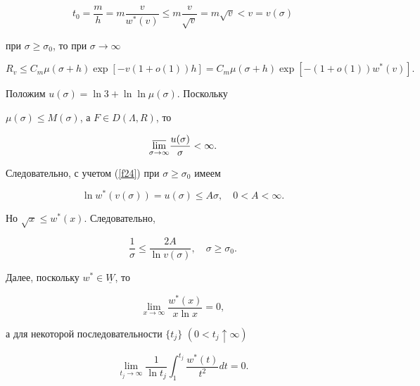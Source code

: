 $$


t_{0}=\frac{m}{h}=m\frac{v}{w^{*}(v)}\leq


m\frac{v}{\sqrt{v}}=m\sqrt{v}<v=v(\sigma)


$$


при $\sigma\geq\sigma_{0}$, то при $\sigma\to\infty$


\begin{equation}\label{f25}


R_{v}\leq C_{m}\mu(\sigma+h)\exp[-v(1+o(1))h]=


C_{m}\mu(\sigma+h)\exp[-(1+o(1))w^{*}(v)].


\end{equation}





Положим $u(\sigma)=\ln 3+\ln \ln \mu(\sigma)$. Поскольку


$\mu(\sigma)\leq M(\sigma)$, а $F\in D(\Lambda,R)$, то


$$


\underset{\sigma\to\infty}{\varlimsup}{}\frac{u(\sigma)}{\sigma}<\infty.


$$


Следовательно, с учетом (\ref{f24}) при $\sigma\geq\sigma_{0}$ имеем


$$


\ln w^{*}(v(\sigma))=u(\sigma)\leq A \sigma,\quad 0<A<\infty.


$$


Но $\sqrt{x}\leq w^{*}(x)$. Следовательно,


\begin{equation}\label{f26}


\frac{1}{\sigma}\leq\frac{2A}{\ln v(\sigma)},\quad \sigma\geq\sigma_{0}.


\end{equation}


Далее, поскольку $w^{*}\in \underline{W}$, то


\begin{equation}\label{f27}


\lim_{x\to\infty}\frac{w^{*}(x)}{x\ln x}=0,


\end{equation}


а для некоторой последовательности $\{t_{j}\}$ $(0<t_{j}\uparrow\infty)$


\begin{equation}\label{f28}


\lim_{t_{j}\to\infty}\frac{1}{\ln t_{j}}


\int_{1}^{t_{j}}\frac{w^{*}(t)}{t^{2}}dt=0.


\end{equation}


